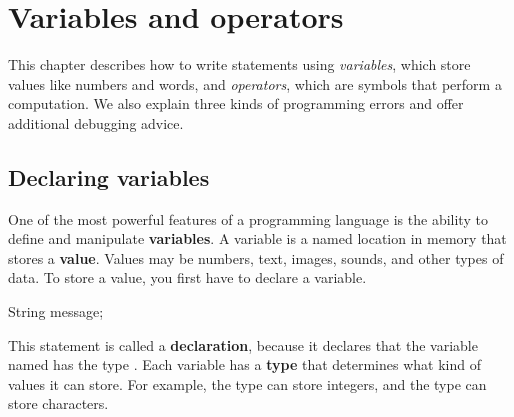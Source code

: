 \chapter{Variables and operators}

This chapter describes how to write statements using {\em variables}, which store values like numbers and words, and {\em operators}, which are symbols that perform a computation.
We also explain three kinds of programming errors and offer additional debugging advice.



\section{Declaring variables}



One of the most powerful features of a programming language is the ability to define and manipulate {\bf variables}.
A variable is a named location in memory that stores a {\bf value}.
Values may be numbers, text, images, sounds, and other types of data.
To store a value, you first have to declare a variable.

\begin{code}
String message;
\end{code}


This statement is called a {\bf declaration}, because it declares that the variable named  has the type .
Each variable has a {\bf type} that determines what kind of values it can store.
For example, the  type can store integers, and the  type can store characters.

